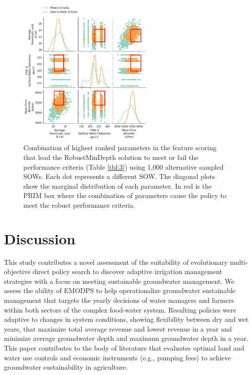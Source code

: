 \documentclass[a4paper,fleqn]{cas-sc}
\begin{document}
\begin{figure}[htb!]
    \includegraphics[width=0.6\textwidth,center]{./figs/prim_robust_mindepth.png}
    \caption{Combination of highest ranked parameters in the feature scoring that lead the RobustMinDepth solution to meet or fail the performance criteria (Table \ref{tbl:3}) using 1,000 alternative sampled SOWs. Each dot represents a different SOW. The diagonal plots show the marginal distribution of each parameter. In red is the PRIM box where the combination of parameters cause the policy to meet the robust performance criteria.} \label{fig:9}
\end{figure}

\clearpage
\section{Discussion}

This study contributes a novel assessment of the suitability of evolutionary multi-objective direct policy search to discover adaptive irrigation management strategies with a focus on meeting sustainable groundwater management. We assess the ability of EMODPS to help operationalize groundwater sustainable management that targets the yearly decisions of water managers and farmers within both sectors of the complex food-water system. Resulting policies were adaptive to changes in system conditions, showing flexibility between dry and wet years, that maximize total average revenue and lowest revenue in a year and minimize average groundwater depth and maximum groundwater depth in a year. This paper contributes to the body of literature that evaluates optimal land and water use controls and economic instruments (e.g., pumping fees) to achieve groundwater sustainability in agriculture. 
\end{document}
